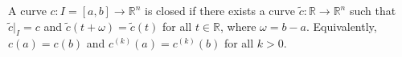 A curve $c: I = [a, b] \to \mathbb{R}^n$ is closed if there exists a curve $\tilde{c}: \mathbb{R} \to \mathbb{R}^n$ such that $\tilde{c}|_I = c$ and $\tilde{c}(t + \omega) = \tilde{c}(t)$ for all $t \in \mathbb{R}$, where $\omega = b - a$. Equivalently, $c(a) = c(b)$ and $c^{(k)}(a) = c^{(k)}(b)$ for all $k > 0$.